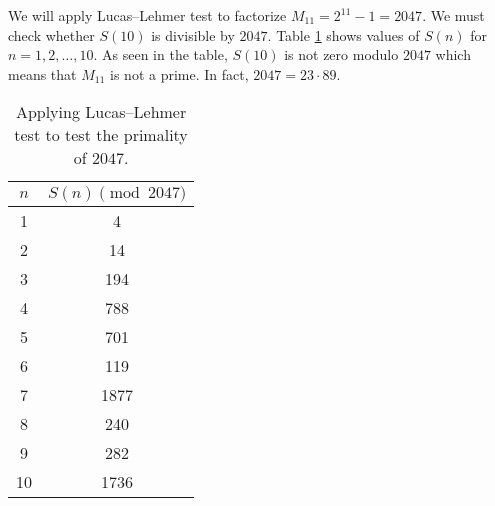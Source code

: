 \documentclass{subfiles}
\begin{document}
%

		\begin{example}
			We will apply Lucas--Lehmer test to factorize $M_{11}=2^{11}-1=2047$. We must check whether $S(10)$ is divisible by $2047$. Table \ref{table:lucas-lehmer} shows values of $S(n)$ for $n=1,2,\ldots,10$. As seen in the table, $S(10)$ is not zero modulo $2047$ which means that $M_{11}$ is not a prime. In fact, $2047=23 \cdot 89$.
			\begin{table}
				\centering
				\begin{tabular}{|c|c|}
				\hline
				$n$ & $S(n) \pmod {2047}$ \\
				\hline
				1 & 4 \\
				\hline
				2 & 14 \\
				\hline
				3 & 194 \\
				\hline
				4 & 788 \\
				\hline
				5 & 701 \\
				\hline
				6 & 119 \\
				\hline
				7 & 1877 \\
				\hline
				8 & 240 \\
				\hline
				9 & 282 \\
				\hline
				10 & 1736 \\
				\hline
			\end{tabular}
			\caption{Applying Lucas--Lehmer test to test the primality of $2047$.}
			\label{table:lucas-lehmer}
			\end{table}
		\end{example}
\end{document}
